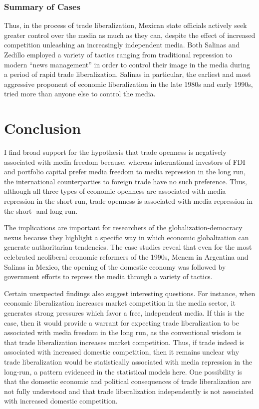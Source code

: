 \documentclass[12pt,a4paper]{article}\usepackage[]{graphicx}\usepackage[]{color}
\begin{document}
\subsubsection{Summary of Cases}

Thus, in the process of trade liberalization, Mexican state officials actively seek greater control over the media as much as they can, despite the effect of increased competition unleashing an increasingly independent media. Both Salinas and Zedillo employed a variety of tactics ranging from traditional repression to modern “news management” in order to control their image in the media during a period of rapid trade liberalization. Salinas in particular, the earliest and most aggressive proponent of economic liberalization in the late 1980s and early 1990s, tried more than anyone else to control the media.

\section{Conclusion}

I find broad support for the hypothesis that trade openness is negatively associated with media freedom because, whereas international investors of FDI and portfolio capital prefer media freedom to media repression in the long run, the international counterparties to foreign trade have no such preference. Thus, although all three types of economic openness are associated with media repression in the short run, trade openness is associated with media repression in the short- and long-run.

The implications are important for researchers of the globalization-democracy nexus because they highlight a specific way in which economic globalization can generate authoritarian tendencies. The case studies reveal that even for the most celebrated neoliberal economic reformers of the 1990s, Menem in Argentina and Salinas in Mexico, the opening of the domestic economy was followed by government efforts to repress the media through a variety of tactics. 

Certain unexpected findings also suggest interesting questions. For instance, when economic liberalization increases market competition in the media sector, it generates strong pressures which favor a free, independent media. If this is the case, then it would provide a warrant for expecting trade liberalization to be associated with media freedom in the long run, as the conventional wisdom is that trade liberalization increases market competition. Thus, if trade indeed is associated with increased domestic competition, then it remains unclear why trade liberalization would be statistically associated with media repression in the long-run, a pattern evidenced in the statistical models here. One possibility is that the domestic economic and political consequences of trade liberalization are not fully understood and that trade liberalization independently is not associated with increased domestic competition.
\end{document}
